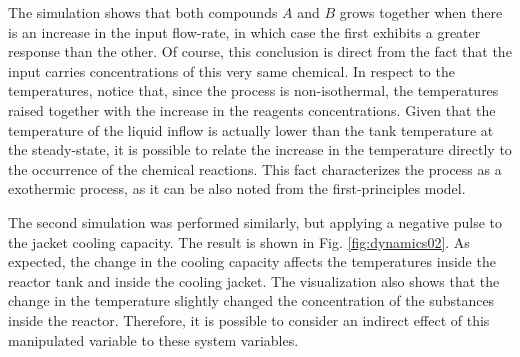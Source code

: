 \documentclass[a4paper,11pt]{book}
\numberwithin{figure}{chapter}
\numberwithin{equation}{chapter}
\numberwithin{table}{chapter}
\theoremstyle{definition}
\begin{document}
The simulation shows that both compounds $A$ and $B$ grows together when there is an increase in the input flow-rate, in which case the first exhibits a greater response than the other. Of course, this conclusion is direct from the fact that the input carries concentrations of this very same chemical. In respect to the temperatures, notice that, since the process is non-isothermal, the temperatures raised together with the increase in the reagents concentrations. Given that the temperature of the liquid inflow is actually lower than the tank temperature at the steady-state, it is possible to relate the increase in the temperature directly to the occurrence of the chemical reactions. This fact characterizes the process as a exothermic process, as it can be also noted from the first-principles model.

The second simulation was performed similarly, but applying a negative pulse to the jacket cooling capacity. The result is shown in Fig. \ref{fig:dynamics02}. As expected, the change in the cooling capacity affects the temperatures inside the reactor tank and inside the cooling jacket. The visualization also shows that the change in the temperature slightly changed the concentration of the substances inside the reactor. Therefore, it is possible to consider an indirect effect of this manipulated variable to these system variables.
\end{document}
